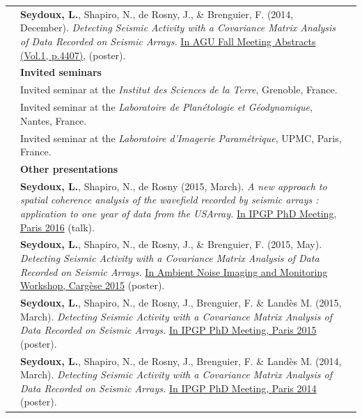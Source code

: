 \documentclass[9pt]{scrbook}
\begin{document}
\begin{tabularx}{\textwidth}{R{5em}ll}
\textcolor{gray}{} & \small \parbox[t]{0.8\textwidth}{\textbf{Seydoux, L.}, Shapiro, N., de Rosny, J., \& Brenguier, F. (2014, December). {\slshape Detecting Seismic Activity with a Covariance Matrix Analysis of Data Recorded on Seismic Arrays.} \href{http://adsabs.harvard.edu/abs/2014AGUFM.S41A4407S}{In AGU Fall Meeting Abstracts (Vol.1, p.4407)}, (poster).}\\[5em]


& {\bfseries Invited seminars} \\[1em]
\textcolor{gray}{} & Invited seminar at the {\slshape Institut des Sciences de la Terre}, Grenoble, France.\\
\textcolor{gray}{} & Invited seminar at the {\slshape Laboratoire de Planétologie et Géodynamique}, Nantes, France.\\
\textcolor{gray}{} & Invited seminar at the {\slshape Laboratoire d'Imagerie Paramétrique}, UPMC, Paris, France.\\[2em]


& {\bfseries Other presentations} \\[1em]

\textcolor{gray}{} & \small \parbox[t]{0.8\textwidth}{\textbf{Seydoux, L.}, Shapiro, N., de Rosny (2015, March). {\slshape A new approach to spatial coherence analysis of the wavefield recorded by seismic arrays : application to one year of data from the USArray.} \href{https://hekla.ipgp.fr/cdd2016/tmp/abstract112.pdf}{In IPGP PhD Meeting, Paris 2016} (talk).}\\[3.5em]

\textcolor{gray}{} & \small \parbox[t]{0.8\textwidth}{\textbf{Seydoux, L.}, Shapiro, N., de Rosny, J., \& Brenguier, F. (2015, May). {\slshape Detecting Seismic Activity with a Covariance Matrix Analysis of Data Recorded on Seismic Arrays.} \href{https://isterre.fr/research-28/teams/waves-and-structures/ambient-noise-imaging-and-monitoring-workshop-cargese-2015}{In Ambient Noise Imaging and Monitoring Workshop, Carg\`ese 2015} (poster).}\\[3.5em]

\textcolor{gray}{} & \small \parbox[t]{0.8\textwidth}{\textbf{Seydoux, L.}, Shapiro, N., de Rosny, J., Brenguier, F. \& Land\`es M. (2015, March). {\slshape Detecting Seismic Activity with a Covariance Matrix Analysis of Data Recorded on Seismic Arrays.} \href{https://hekla.ipgp.fr/cdd2015/tmp/abstract1067.pdf}{In IPGP PhD Meeting, Paris 2015} (poster).}\\[3.5em]

\textcolor{gray}{} & \small \parbox[t]{0.8\textwidth}{\textbf{Seydoux, L.}, Shapiro, N., de Rosny, J., Brenguier, F. \& Land\`es M. (2014, March). {\slshape Detecting Seismic Activity with a Covariance Matrix Analysis of Data Recorded on Seismic Arrays.} \href{https://hekla.ipgp.fr/cdd2014/tmp/abstract1067.pdf}{In IPGP PhD Meeting, Paris 2014} (poster).}


\end{tabularx} 
\end{document}
